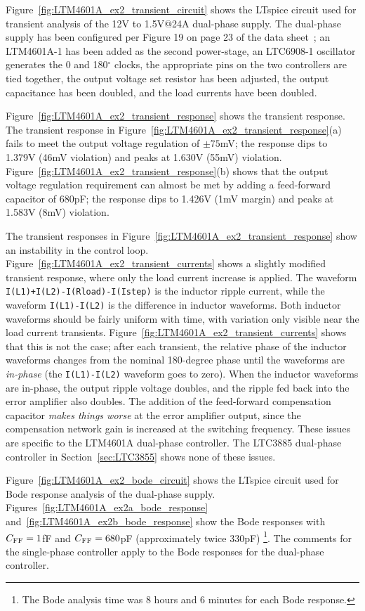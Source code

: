 Figure~\ref{fig:LTM4601A_ex2_transient_circuit} shows the LTspice
circuit used for transient analysis of the 12V to 1.5V@24A dual-phase
supply. The dual-phase supply has been configured per Figure 19 on
page 23 of the data sheet~\cite{Linear_LTM4601A_2011}; 
an LTM4601A-1 has been added as the second power-stage,
an LTC6908-1 oscillator generates the 0 and 180$^\circ$
clocks, the appropriate pins on the two controllers are
tied together, the output voltage set resistor has been
adjusted, the output capacitance has been doubled, and
the load currents have been doubled.

Figure~\ref{fig:LTM4601A_ex2_transient_response} shows the
transient response. The transient response in 
Figure~\ref{fig:LTM4601A_ex2_transient_response}(a) fails to meet
the output voltage regulation of $\pm75$mV; the response dips to
1.379V (46mV violation) and peaks at 1.630V (55mV) violation.
Figure~\ref{fig:LTM4601A_ex2_transient_response}(b) shows that
the output voltage regulation requirement can almost be met
by adding a feed-forward capacitor of 680pF;  the response dips to
1.426V (1mV margin) and peaks at 1.583V (8mV) violation.

The transient responses in Figure~\ref{fig:LTM4601A_ex2_transient_response}
show an instability in the control loop. 
Figure~\ref{fig:LTM4601A_ex2_transient_currents} shows
a slightly modified transient response, where only the load
current increase is applied. The waveform
\verb|I(L1)+I(L2)-I(Rload)-I(Istep)| is the inductor ripple
current, while the waveform
\verb+I(L1)-I(L2)+ is the difference in inductor waveforms.
Both inductor waveforms should be fairly uniform with time,
with variation only visible near the load current transients.
Figure~\ref{fig:LTM4601A_ex2_transient_currents} shows that
this is not the case; after each transient, the relative phase of
the inductor waveforms changes from the nominal 180-degree
phase until the waveforms are {\em in-phase} (the
\verb+I(L1)-I(L2)+ waveform goes to zero). When the inductor
waveforms are in-phase, the output ripple voltage doubles, and 
the ripple fed back into the error amplifier also doubles.
The addition of the feed-forward compensation capacitor
{\em makes things worse} at the error amplifier output,
since the compensation network gain is increased at the
switching frequency. These issues are specific to the
LTM4601A dual-phase controller. The LTC3885 dual-phase
controller in Section~\ref{sec:LTC3855} shows none of
these issues.

Figure~\ref{fig:LTM4601A_ex2_bode_circuit} shows the LTspice
circuit used for Bode response analysis of the dual-phase supply.
Figures~\ref{fig:LTM4601A_ex2a_bode_response}
and~\ref{fig:LTM4601A_ex2b_bode_response}
show the Bode responses with $C_{\rm FF} = 1$fF and
$C_{\rm FF} = 680$pF (approximately twice 330pF)
\footnote{The Bode analysis time
was 8 hours and 6 minutes for each Bode response.}.
The comments for the single-phase controller apply to the
Bode responses for the dual-phase controller.


